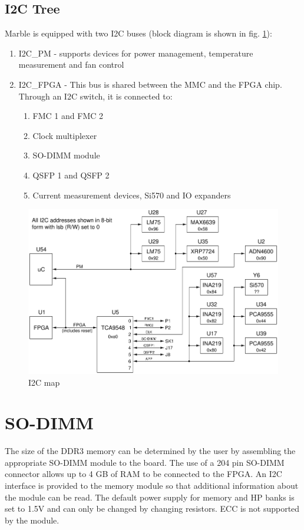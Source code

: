 \documentclass[12pt,oneside,a4]{article}
\begin{document}
\subsection{I2C Tree}
Marble is equipped with two I2C buses (block diagram is shown in fig. \ref{i2c}):
\begin{enumerate}
	\item I2C\_PM - supports devices for power management, temperature measurement and fan control
	\item I2C\_FPGA - This bus is shared between the MMC and the FPGA chip. Through an I2C switch, it is connected to:
	\begin{enumerate}
		\item FMC 1 and FMC 2
		\item Clock multiplexer
		\item SO-DIMM module
		\item QSFP 1 and QSFP 2
		\item Current measurement devices, Si570 and IO expanders
	\end{enumerate}
\end{enumerate}
\begin{figure}[H]
\begin{center}
\includegraphics[width=1\linewidth]{marble2_i2c.png}
 \caption{I2C map}\label{i2c}
\end{center}
\end{figure}

\section{SO-DIMM}

The size of the DDR3 memory can be determined by the user by assembling the appropriate SO-DIMM module to the board. The use of a 204 pin SO-DIMM connector allows up to 4 GB of RAM to be connected to the FPGA. An I2C interface is provided to the memory module so that additional information about the module can be read. The default power supply for memory and HP banks is set to 1.5V and can only be changed by changing resistors. ECC is not supported by the module.\\
\end{document}

